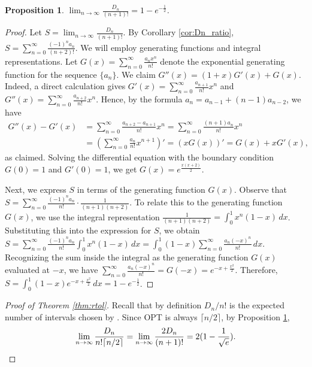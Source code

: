 \documentclass[reqno,11pt]{article} %
\newtheorem{proposition}[theorem]{Proposition}
\theoremstyle{remark}
\newcommand{\RtoL}{\text{RevtoL}\xspace} %
\newcommand{\OPT}{\textsc{OPT}\xspace}
\begin{document}
\begin{proposition} \label{lem:lim}
	$\lim_{n\to \infty} \frac{D_n}{(n+1)!}= 1 - e^{-\frac{1}{2}}$.
\end{proposition}

\begin{proof}
Let
    $S = \lim_{n\to \infty} \frac{D_n}{(n+1)!}$. 
By Corollary \ref{cor:Dn_ratio},
    $S=\sum_{n=0}^{\infty} \frac{(-1)^n a_n}{(n+2)!}$.
We will employ generating functions and integral representations. Let 
    $G(x) = \sum_{n=0}^{\infty} \frac{a_n x^n}{n!}$ 
denote the exponential generating function for the sequence $\{a_n\}$. We claim 
        $G''(x) = (1+x) G'(x) + G(x)$. 
    Indeed, a direct calculation gives
        $G'(x) = \sum_{n=0}^\infty \frac{a_{n+1}}{n!}x^n$
    and
        $G''(x) = \sum_{n=0}^\infty \frac{a_{n+2}}{n!}x^n$.
    Hence, by the formula 
        $a_n = a_{n-1} + (n-1)a_{n-2}$,
    we have
    \begin{align*}
        G''(x) - G'(x)
        &= \sum_{n=0}^\infty \frac{a_{n+2} - a_{n+1}}{n!}x^n    
        = \sum_{n=0}^\infty \frac{(n+1)a_n}{n!}x^n  \\
        &= \left( \sum_{n=0}^\infty \frac{a_n}{n!}x^{n+1}  \right)' 
        = ( x G(x) )'
        = G(x) + xG'(x),
    \end{align*}
    as claimed.
    Solving the differential equation %
with the boundary condition
        $G(0) = 1$
    and 
        $G'(0) = 1$,
    we get $G(x) = e^{\frac{x(x+2)}{2}}$.




   
Next, we express $S$ in terms of the generating function $G(x)$. Observe that
    $S = \sum_{n=0}^{\infty} \frac{(-1)^n a_n}{n!} \cdot \frac{1}{(n+1)(n+2)}$.
To relate this to the generating function $G(x)$, we use the integral representation
    $\frac{1}{(n+1)(n+2)} = \int_0^1 x^n (1 - x) \, dx$.
Substituting this into the expression for $S$, we obtain
    $S = \sum_{n=0}^{\infty} \frac{(-1)^n a_n}{n!} \int_0^1 x^n (1 - x) \, dx = \int_0^1 (1 - x) \sum_{n=0}^{\infty} \frac{a_n (-x)^n}{n!} \, dx$.
Recognizing the sum inside the integral as the generating function $G(x)$ evaluated at $-x$, we have
	$\sum_{n=0}^{\infty} \frac{a_n (-x)^n}{n!} = G(-x) = e^{-x + \frac{x^2}{2}}$.
Therefore,
$S = \int_0^1 (1 - x) e^{-x + \frac{x^2}{2}} \, dx = 1 - e^{-\frac{1}{2}}$.
\end{proof}


\begin{proof}[Proof of Theorem \ref{thm:rtol}]
    Recall that by definition $D_n/n!$ is the expected number of intervals chosen by \RtoL. 
Since \OPT is always $\lceil n/2 \rceil$, by  Proposition \ref{lem:lim}, %
    \[
        \lim_{n\to \infty} \frac{D_n}{n!\lceil n/2 \rceil} = \lim_{n\to \infty} \frac{2D_n}{(n+1)!} = 2(1-\frac{1}{\sqrt{e}}).    \qedhere
    \]    
\end{proof}
\end{document}
